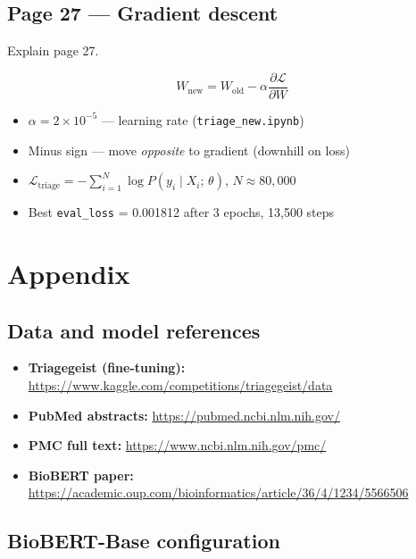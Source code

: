 \documentclass[11pt]{article}
\begin{document}
\subsection{Page 27 --- Gradient descent}

\begin{questionbox}
Explain page 27.
\end{questionbox}

\begin{answerbox}
\[
W_{\mathrm{new}} = W_{\mathrm{old}} - \alpha \frac{\partial \mathcal{L}}{\partial W}
\]
\begin{itemize}
  \item $\alpha = 2 \times 10^{-5}$ --- learning rate (\texttt{triage\_new.ipynb})
  \item Minus sign --- move \textit{opposite} to gradient (downhill on loss)
  \item $\mathcal{L}_{\mathrm{triage}} = -\sum_{i=1}^{N} \log P(y_i \mid X_i;\, \theta)$, $N \approx 80{,}000$
  \item Best \texttt{eval\_loss} = 0.001812 after 3 epochs, 13{,}500 steps
\end{itemize}
\end{answerbox}

\section{Appendix}

\subsection{Data and model references}

\begin{itemize}
  \item \textbf{Triagegeist (fine-tuning):} \url{https://www.kaggle.com/competitions/triagegeist/data}
  \item \textbf{PubMed abstracts:} \url{https://pubmed.ncbi.nlm.nih.gov/}
  \item \textbf{PMC full text:} \url{https://www.ncbi.nlm.nih.gov/pmc/}
  \item \textbf{BioBERT paper:} \url{https://academic.oup.com/bioinformatics/article/36/4/1234/5566506}
\end{itemize}

\subsection{BioBERT-Base configuration}
\end{document}
